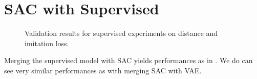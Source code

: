 \section{SAC with Supervised}

\begin{figure}
    \begin{center}
        \hfill
    \end{center}
    \caption[Supervised Distance and Imitation Loss]{Validation results for supervised experiments on distance and imitation loss. }
    \label{fig:sac_supervised}
\end{figure}

Merging the supervised model with SAC yields performances as in . We do can see very similar performances as with merging SAC with VAE. 

